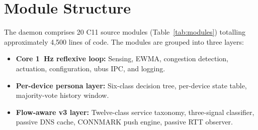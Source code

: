 \section{Module Structure}

The daemon comprises 20 C11 source modules (Table~\ref{tab:modules}) totalling approximately 4,500 lines of code. The modules are grouped into three layers:

\begin{itemize}
  \item \textbf{Core 1~Hz reflexive loop:} Sensing, EWMA, congestion detection, actuation, configuration, ubus IPC, and logging.
  \item \textbf{Per-device persona layer:} Six-class decision tree, per-device state table, majority-vote history window.
  \item \textbf{Flow-aware v3 layer:} Twelve-class service taxonomy, three-signal classifier, passive DNS cache, CONNMARK push engine, passive RTT observer.
\end{itemize}


